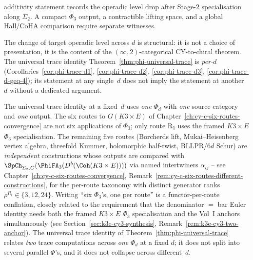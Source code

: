 \begin{remark}
\begin{description}
additivity statement records the operadic level drop after
Stage-$2$ specialisation along \(\Sigma_2\). A compact $\Phi_3$ output,
a contractible lifting space, and a global Hall/CoHA comparison require
separate witnesses.
\end{description}
The change of target operadic level across $d$ is structural: it is not a choice of presentation, it is the content of the $(\infty, 2)$-categorical CY-to-chiral theorem. The universal trace identity Theorem~\ref{thm:phi-universal-trace} is \emph{per-$d$} (Corollaries~\ref{cor:phi-trace-d1}, \ref{cor:phi-trace-d2}, \ref{cor:phi-trace-d3}, \ref{cor:phi-trace-d-geq-4}); its statement at any single~$d$ does not imply the statement at another~$d$ without a dedicated argument.
\end{remark}

\begin{remark}[One \texorpdfstring{$\Phi$}{Phi} per category type: six routes \texorpdfstring{$\neq$}{!=} six \texorpdfstring{$\Phi$}{Phi}'s]
\label{rem:phiutp-one-phi-per-category}
The universal trace identity at a fixed~$d$ uses \emph{one} $\Phi_d$ with \emph{one} source category and \emph{one} output. The six routes to $G(K3 \times E)$ of Chapter~\ref{ch:cy-c-six-routes-convergence} are not six applications of $\Phi_3$; only route R\textsubscript{1} uses the framed $K3\times E$ $\Phi_3$ specialisation. The remaining five routes (Borcherds lift, Mukai--Heisenberg vertex algebra, threefold Kummer, holomorphic half-twist, BLLPR/$6d$ Schur) are \emph{independent} constructions whose outputs are compared with $\SpCh_{\Sigma_2,C}(\PhiFA_3(D^b(\Coh(K3 \times E))))$ via named intertwiners $\alpha_{ij}$ -- see Chapter~\ref{ch:cy-c-six-routes-convergence}, Remark~\ref{rem:cy-c-six-routes-different-constructions}, for the per-route taxonomy with distinct generator ranks $\rho^{R_i} \in \{3, 12, 24\}$. Writing ``six $\Phi_3$'s, one per route'' is a functor-per-route conflation, closely related to the requirement that the denominator $=$ bar Euler identity needs both the framed $K3\times E$ $\Phi_3$ specialisation and the Vol~I anchors simultaneously (see Section~\ref{sec:k3e-cy3-synthesis}, Remark~\ref{rem:k3e-cy3-two-anchor}). The universal trace identity of Theorem~\ref{thm:phi-universal-trace} relates \emph{two} trace computations across \emph{one} $\Phi_d$ at a fixed $d$; it does not split into several parallel $\Phi$'s, and it does not collapse across different~$d$.
\end{remark}

